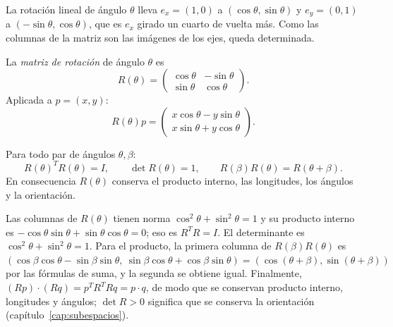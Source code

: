 La rotación lineal de ángulo \(\theta\) lleva \(e_x=(1,0)\) a \((\cos\theta,\sin\theta)\) y
\(e_y=(0,1)\) a \((-\sin\theta,\cos\theta)\), que es \(e_x\) girado un cuarto de vuelta más.
Como las columnas de la matriz son las imágenes de los ejes, queda determinada.

\begin{definicion}
La \emph{matriz de rotación} de ángulo \(\theta\) es
\[
  R(\theta)=
  \begin{pmatrix}
    \cos\theta&-\sin\theta\\
    \sin\theta& \cos\theta
  \end{pmatrix}.
\]
Aplicada a \(p=(x,y)\):
\[
  R(\theta)p=
  \begin{pmatrix}
    x\cos\theta-y\sin\theta\\
    x\sin\theta+y\cos\theta
  \end{pmatrix}.
\]
\end{definicion}

\begin{center}
\end{center}

\begin{proposicion}\label{prop:propiedades-R}
Para todo par de ángulos \(\theta,\beta\):
\[
R(\theta)^TR(\theta)=I,\qquad
\det R(\theta)=1,\qquad
R(\beta)R(\theta)=R(\theta+\beta).
\]
En consecuencia \(R(\theta)\) conserva el producto interno, las longitudes, los ángulos y la
orientación.
\end{proposicion}

\begin{demostracion}
Las columnas de \(R(\theta)\) tienen norma \(\cos^2\theta+\sin^2\theta=1\) y su producto
interno es \(-\cos\theta\sin\theta+\sin\theta\cos\theta=0\); eso es \(R^TR=I\). El
determinante es \(\cos^2\theta+\sin^2\theta=1\). Para el producto, la primera columna de
\(R(\beta)R(\theta)\) es
\((\cos\beta\cos\theta-\sin\beta\sin\theta,\ \sin\beta\cos\theta+\cos\beta\sin\theta)
=(\cos(\theta+\beta),\sin(\theta+\beta))\) por las fórmulas de suma, y la segunda se obtiene
igual. Finalmente, \((Rp)\cdot(Rq)=p^TR^TRq=p\cdot q\), de modo que se conservan producto
interno, longitudes y ángulos; \(\det R>0\) significa que se conserva la orientación
(capítulo~\ref{cap:subespacios}).
\end{demostracion}

